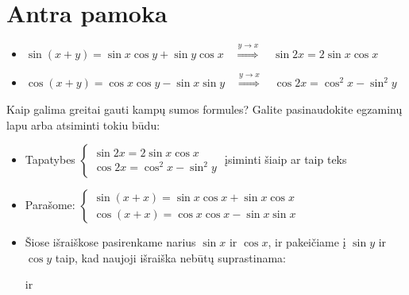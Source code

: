\documentclass[a4paper]{article}
\begin{document}
\section{Antra pamoka}
\begin{mdframed}[backgroundcolor=yellow!50!white]
\begin{itemize}
\item $\sin(x+y)=\sin{x}\cos{y}+\sin{y}\cos{x}\quad \stackrel{y \to x}{\Rightarrow} \quad \sin 2x = 2\sin x \cos x$
\item $\cos(x+y)=\cos{x}\cos{y}-\sin{x}\sin{y}\quad \stackrel{y \to x}{\Rightarrow} \quad \cos 2x = \cos^2x-\sin^2y$
\end{itemize}
\end{mdframed}
Kaip galima greitai gauti kampų sumos formules? Galite pasinaudokite egzaminų lapu arba atsiminti tokiu būdu: 
\begin{itemize}
\item Tapatybes $\begin{cases}\sin 2x = 2\sin x \cos x \\ \cos 2x = \cos^2x-\sin^2y\end{cases}$ įsiminti šiaip ar taip teks
\item Parašome: $\begin{cases}\sin (x+x) = \sin x \cos x+\sin x \cos x \\ \cos (x+x) = \cos x\cos x-\sin x \sin x\end{cases}$
\item Šiose išraiškose pasirenkame narius $\sin x$ ir $\cos x$, ir pakeičiame į $\sin y$ ir $\cos y$ taip, kad naujoji išraiška nebūtų suprastinama:

 ir 
\end{itemize}
\end{document}
